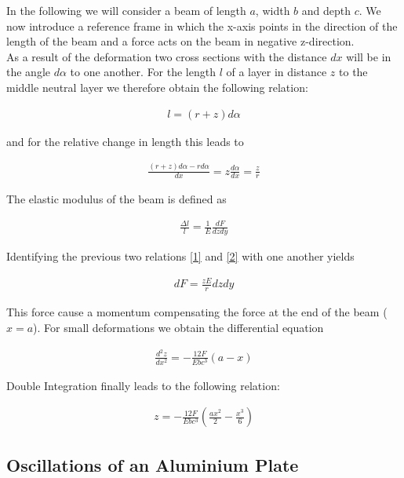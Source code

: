 In the following we will consider a beam of length $a$, width $b$ and depth $c$. We now introduce a reference frame in which the x-axis points in the direction of the length of the beam and a force acts on the beam in negative z-direction.\\

As a result of the deformation two cross sections with the distance $dx$ will be in the angle $d\alpha$ to one another. For the length $l$ of a layer in distance $z$ to the middle neutral layer we therefore obtain the following relation:

\begin{align}
l=(r+z)d\alpha
\end{align}


and for the relative change in length this leads to

\begin{align}
\frac{(r+z)d\alpha-r d\alpha}{dx}=z\frac{d\alpha}{dx}=\frac{z}{r} \label{1}
\end{align}


The elastic modulus of the beam is defined as

\begin{align}
\frac{\Delta l}{l}=\frac{1}{E}\frac{dF}{dzdy} \label{2}
\end{align}


Identifying the previous two relations \ref{1} and \ref{2} with one another yields

\begin{align}
dF=\frac{zE}{r}dzdy
\end{align}

This force cause a momentum compensating the force at the end of the beam ( $x=a$). For small deformations we obtain the differential equation

\begin{align}
\frac{d^2z}{dx^2}=-\frac{12F}{Ebc^3}(a-x)
\end{align}

Double Integration finally leads to the following relation:

\begin{align}
z=-\frac{12F}{Ebc^3}\left(\frac{ax^2}{2}-\frac{x^3}{6} \right)
\end{align}


\subsection{Oscillations of an Aluminium Plate}

